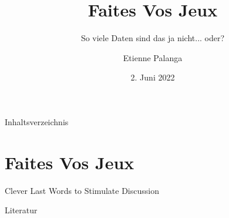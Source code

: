 \documentclass[aspectratio=169,10pt, notes]{beamer}
\title{Faites Vos Jeux}
\subtitle{So viele Daten sind das ja nicht... oder?}
\author{Etienne Palanga}
\date{2. Juni 2022}
\institute{TU Dortmund - Fakultät Informatik}
\begin{document}
\maketitle

\begin{frame}{Inhaltsverzeichnis}
    \tableofcontents
\end{frame}

\section{Faites Vos Jeux \cite{kees_faites_2017}}









\begin{frame}[t,standout]
\Large
Clever Last Words to Stimulate Discussion

\end{frame}

\nocite{kees_faites_2017}
\nocite{lee_ethical_2016}
\nocite{zankl_international_2014}

\begin{frame}{Literatur}
\printbibliography[heading=none]
\end{frame}
\end{document}
